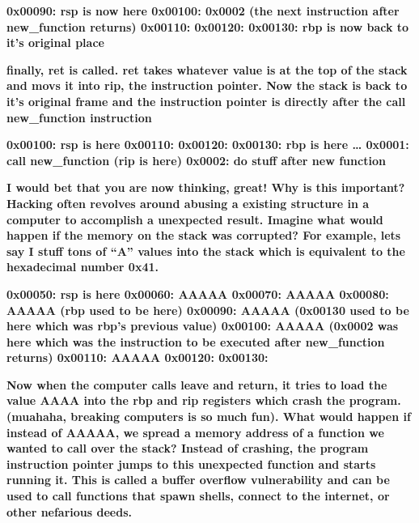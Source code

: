 \textbf{0x00090: rsp is now here\newline
0x00100: 0x0002 (the next instruction after new\_function returns)\newline
0x00110:\newline
0x00120:\newline
0x00130: rbp is now back to it's original place}

\textbf{finally, ret is called. ret takes whatever value is at the top of the stack and movs it into rip, the
instruction pointer. Now the stack is back to it's original frame and the instruction pointer is directly after the
call new\_function instruction}

\textbf{0x00100: rsp is here\newline
0x00110:\newline
0x00120:\newline
0x00130: rbp is here\newline
{\dots}\newline
0x0001: call new\_function\newline
(rip is here)\newline
0x0002: do stuff after new function}

\textbf{I would bet that you are now thinking, great! Why is this important? Hacking often revolves around abusing a
existing structure in a computer to accomplish a unexpected result. Imagine what would happen if the memory on the
stack was corrupted? For example, lets say I stuff tons of ``A'' values into the stack which is equivalent to the
hexadecimal number 0x41.}

\textbf{0x00050: rsp is here\newline
0x00060: AAAAA\newline
0x00070: AAAAA\newline
0x00080: AAAAA (rbp used to be here)\newline
0x00090: AAAAA (0x00130 used to be here which was rbp's previous value)\newline
0x00100: AAAAA (0x0002 was here which was the instruction to be executed after new\_function returns)\newline
0x00110: AAAAA\newline
0x00120:\newline
0x00130:}

\textbf{Now when the computer calls leave and return, it tries to load the value AAAA into the rbp and rip registers
which crash the program. (muahaha, breaking computers is so much fun). What would happen if instead of AAAAA, we spread
a memory address of a function we wanted to call over the stack? Instead of crashing, the program instruction pointer
jumps to this unexpected function and starts running it. This is called a buffer overflow vulnerability and can be used
to call functions that spawn shells, connect to the internet, or other nefarious deeds.}

